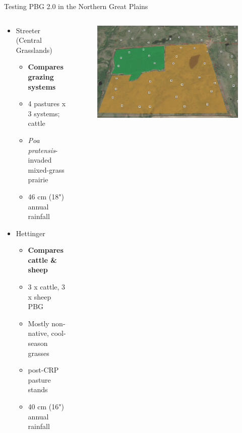 \documentclass[11pt]{beamer}
\begin{document}
\begin{frame}{Testing PBG 2.0 in the Northern Great Plains } 
	\begin{columns}
		\begin{column}{0.6\textwidth}
			\begin{itemize}
				\item \alert{Streeter (Central Grasslands)}
				\begin{itemize}
					\item \textbf{Compares grazing systems}
					\item 4 pastures x 3 systems; cattle
					\item \emph{Poa pratensis}-invaded mixed-grass prairie
					\item 46 cm (18") annual rainfall
				\end{itemize}
				\item \alert{Hettinger}
				\begin{itemize}
					\item \textbf{Compares cattle \& sheep}
					\item 3 x cattle, 3 x sheep PBG
					\item Mostly non-native, cool-season grasses
					\item post-CRP pasture stands
					\item 40 cm (16") annual rainfall
				\end{itemize}
			\end{itemize}
		\end{column}
		\begin{column}{0.45\textwidth}  
			\begin{center}
				\begin{figure}
					\includegraphics[width=1\linewidth]{figs/BobPasture}  
				\end{figure}
			\end{center}
		\end{column}
	\end{columns}
\end{frame}
\end{document}
